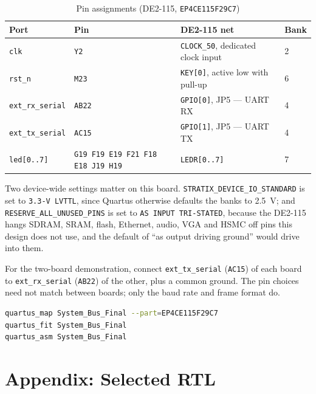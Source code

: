 \documentclass[11pt,a4paper]{article}
\newcommand{\sig}[1]{\texttt{#1}}
\begin{document}
\begin{table}[htbp]
\centering
\caption{Pin assignments (DE2-115, \sig{EP4CE115F29C7})}
\label{tab:pins}
\small
\begin{tabular}{llll}
\toprule
\textbf{Port} & \textbf{Pin} & \textbf{DE2-115 net} & \textbf{Bank} \\
\midrule
\sig{clk}            & \texttt{Y2}   & \texttt{CLOCK\_50}, dedicated clock input & 2 \\
\sig{rst\_n}         & \texttt{M23}  & \texttt{KEY[0]}, active low with pull-up  & 6 \\
\sig{ext\_rx\_serial}& \texttt{AB22} & \texttt{GPIO[0]}, JP5 --- UART RX         & 4 \\
\sig{ext\_tx\_serial}& \texttt{AC15} & \texttt{GPIO[1]}, JP5 --- UART TX         & 4 \\
\sig{led[0..7]}      & \texttt{G19 F19 E19 F21 F18 E18 J19 H19} & \texttt{LEDR[0..7]} & 7 \\
\bottomrule
\end{tabular}
\end{table}

Two device-wide settings matter on this board.
\sig{STRATIX\_DEVICE\_IO\_STANDARD} is set to \sig{3.3-V LVTTL}, since Quartus
otherwise defaults the banks to 2.5~V; and \sig{RESERVE\_ALL\_UNUSED\_PINS} is
set to \sig{AS INPUT TRI-STATED}, because the DE2-115 hangs SDRAM, SRAM, flash,
Ethernet, audio, VGA and HSMC off pins this design does not use, and the default
of ``as output driving ground'' would drive into them.

For the two-board demonstration, connect \sig{ext\_tx\_serial} (\texttt{AC15})
of each board to \sig{ext\_rx\_serial} (\texttt{AB22}) of the other, plus a
common ground. The pin choices need not match between boards; only the baud rate
and frame format do.

\begin{lstlisting}[language=bash, numbers=none, basicstyle=\ttfamily\small,
                   caption={Synthesis, fit and bitstream}]
quartus_map System_Bus_Final --part=EP4CE115F29C7
quartus_fit System_Bus_Final
quartus_asm System_Bus_Final
\end{lstlisting}

\appendix
\section{Appendix: Selected RTL}
\end{document}
